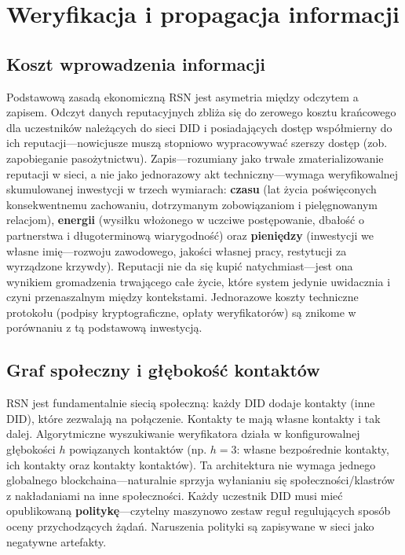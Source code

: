 \documentclass[11pt,a4paper,twocolumn]{article}
\begin{document}
\section{Weryfikacja i propagacja informacji}

\subsection{Koszt wprowadzenia informacji}

Podstawową zasadą ekonomiczną RSN jest asymetria między odczytem a zapisem. Odczyt danych reputacyjnych zbliża się do zerowego kosztu krańcowego dla uczestników należących do sieci DID i posiadających dostęp współmierny do ich reputacji---nowicjusze muszą stopniowo wypracowywać szerszy dostęp (zob. zapobieganie pasożytnictwu). Zapis---rozumiany jako trwałe zmaterializowanie reputacji w sieci, a nie jako jednorazowy akt techniczny---wymaga weryfikowalnej skumulowanej inwestycji w trzech wymiarach: \textbf{czasu} (lat życia poświęconych konsekwentnemu zachowaniu, dotrzymanym zobowiązaniom i pielęgnowanym relacjom), \textbf{energii} (wysiłku włożonego w uczciwe postępowanie, dbałość o partnerstwa i długoterminową wiarygodność) oraz \textbf{pieniędzy} (inwestycji we własne imię---rozwoju zawodowego, jakości własnej pracy, restytucji za wyrządzone krzywdy). Reputacji nie da się kupić natychmiast---jest ona wynikiem gromadzenia trwającego całe życie, które system jedynie uwidacznia i czyni przenaszalnym między kontekstami. Jednorazowe koszty techniczne protokołu (podpisy kryptograficzne, opłaty weryfikatorów) są znikome w porównaniu z tą podstawową inwestycją.

\subsection{Graf społeczny i głębokość kontaktów}

RSN jest fundamentalnie siecią społeczną: każdy DID dodaje kontakty (inne DID), które zezwalają na połączenie. Kontakty te mają własne kontakty i tak dalej. Algorytmiczne wyszukiwanie weryfikatora działa w konfigurowalnej głębokości $h$ powiązanych kontaktów (np. $h=3$: własne bezpośrednie kontakty, ich kontakty oraz kontakty kontaktów). Ta architektura nie wymaga jednego globalnego blockchaina---naturalnie sprzyja wyłanianiu się społeczności/klastrów z nakładaniami na inne społeczności. Każdy uczestnik DID musi mieć opublikowaną \textbf{politykę}---czytelny maszynowo zestaw reguł regulujących sposób oceny przychodzących żądań. Naruszenia polityki są zapisywane w sieci jako negatywne artefakty.
\end{document}
